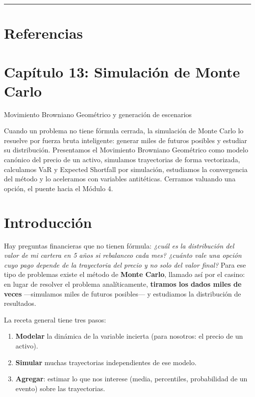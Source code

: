 \documentclass[
  spanish,
  letterpaper,
  DIV=11,
  numbers=noendperiod]{scrreprt}
\providecommand{\tightlist}{%
  \setlength{\itemsep}{0pt}\setlength{\parskip}{0pt}}
\begin{document}
\begin{center}\rule{0.5\linewidth}{0.5pt}\end{center}

\chapter{Referencias}\label{referencias-11}

\label{refs}

\chapter{Capítulo 13: Simulación de Monte
Carlo}\label{capuxedtulo-13-simulaciuxf3n-de-monte-carlo}

Movimiento Browniano Geométrico y generación de escenarios

Cuando un problema no tiene fórmula cerrada, la simulación de Monte
Carlo lo resuelve por fuerza bruta inteligente: generar miles de futuros
posibles y estudiar su distribución. Presentamos el Movimiento Browniano
Geométrico como modelo canónico del precio de un activo, simulamos
trayectorias de forma vectorizada, calculamos VaR y Expected Shortfall
por simulación, estudiamos la convergencia del método y lo aceleramos
con variables antitéticas. Cerramos valuando una opción, el puente hacia
el Módulo 4.

\hfill\break

\chapter{Introducción}\label{introducciuxf3n-10}

Hay preguntas financieras que no tienen fórmula: \emph{¿cuál es la
distribución del valor de mi cartera en 5 años si rebalanceo cada mes?
¿cuánto vale una opción cuyo pago depende de la trayectoria del precio y
no solo del valor final?} Para ese tipo de problemas existe el método de
\textbf{Monte Carlo}, llamado así por el casino: en lugar de resolver el
problema analíticamente, \textbf{tiramos los dados miles de veces}
---simulamos miles de futuros posibles--- y estudiamos la distribución
de resultados.

La receta general tiene tres pasos:

\begin{enumerate}
\def\labelenumi{\arabic{enumi}.}
\tightlist
\item
  \textbf{Modelar} la dinámica de la variable incierta (para nosotros:
  el precio de un activo).
\item
  \textbf{Simular} muchas trayectorias independientes de ese modelo.
\item
  \textbf{Agregar}: estimar lo que nos interese (media, percentiles,
  probabilidad de un evento) sobre las trayectorias.
\end{enumerate}
\end{document}
